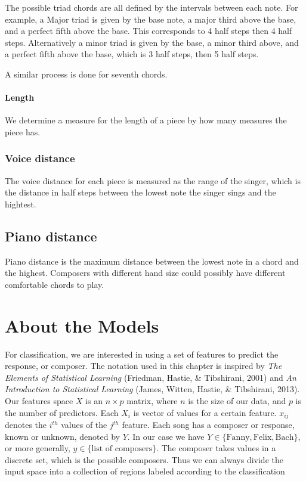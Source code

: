 \documentclass[12pt,twoside]{reedthesis}
\theoremstyle{definition}
\theoremstyle{definition}
\theoremstyle{definition}
\theoremstyle{remark}
\begin{document}
The possible triad chords are all defined by the intervals between each
note. For example, a Major triad is given by the base note, a major
third above the base, and a perfect fifth above the base. This
corresponds to 4 half steps then 4 half steps. Alternatively a minor
triad is given by the base, a minor third above, and a perfect fifth
above the base, which is 3 half steps, then 5 half steps.

A similar process is done for seventh chords.

\subsubsection{Length}\label{length}

We determine a measure for the length of a piece by how many measures
the piece has.

\subsection{Voice distance}\label{voice-distance}

The voice distance for each piece is measured as the range of the
singer, which is the distance in half steps between the lowest note the
singer sings and the hightest.

\section{Piano distance}\label{piano-distance}

Piano distance is the maximum distance between the lowest note in a
chord and the highest. Composers with different hand size could possibly
have different comfortable chords to play.

\chapter{About the Models}\label{about-the-models}

For classification, we are interested in using a set of features to
predict the response, or composer. The notation used in this chapter is
inspired by \emph{The Elements of Statistical Learning} (Friedman,
Hastie, \& Tibshirani, 2001) and \emph{An Introduction to Statistical
Learning} (James, Witten, Hastie, \& Tibshirani, 2013). Our features
space \(X\) is an \(n \times p\) matrix, where \(n\) is the size of our
data, and \(p\) is the number of predictors. Each \(X_i\) is vector of
values for a certain feature. \(x_{ij}\) denotes the \(i^{th}\) values
of the \(j^{th}\) feature. Each song has a composer or response, known
or unknown, denoted by \(Y\). In our case we have
\(Y \in \{\text{Fanny},\text{Felix}, \text{Bach}\}\), or more generally,
\(y \in \{\text{list of composers}\}\). The composer takes values in a
discrete set, which is the possible composers. Thus we can always divide
the input space into a collection of regions labeled according to the
classification
\end{document}
